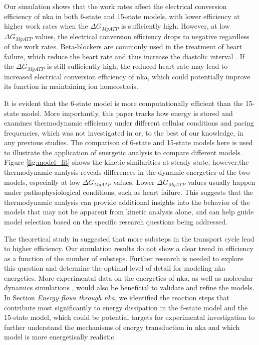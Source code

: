 \documentclass{biophys-new}
\newcommand{\rev}[1]{{\color{black} #1}}
\begin{document}
Our simulation shows that the work rates affect the electrical conversion efficiency of \gls{nka} in both 6-state and 15-state models, with lower efficiency at higher work rates when the $\Delta G_{MgATP}$ is sufficiently high. However, at low $\Delta G_{MgATP}$ values, the electrical conversion efficiency drops to negative regardless of the work rates. Beta-blockers are commonly used in the treatment of heart failure, which reduce the heart rate and thus increase the diastolic interval \cite{kotecha2017heart}. If the $\Delta G_{MgATP}$ is still sufficiently high, the reduced heart rate may lead to increased electrical conversion efficiency of \gls{nka}, which could potentially improve its function in maintaining ion homeostasis. 

\rev{It is evident that the 6-state model is more computationally efficient than the 15-state model. More importantly, this paper tracks how energy is stored and examines thermodynamic efficiency under different cellular conditions and pacing frequencies, which was not investigated in \cite{pan_cardiac_2020} or, to the best of our knowledge, in any previous studies.} The comparison of 6-state and 15-state models here is used to illustrate the application of energetic analysis to compare different models.  Figure \ref{fig:model_fit} shows the kinetic similarities at steady state; however,the thermodynamic analysis reveals differences in the dynamic energetics of the two models, especially at low $\Delta G_{MgATP}$ values. Lower $\Delta G_{MgATP}$ values usually happen under pathophysiological conditions, such as heart failure. This suggests that the thermodynamic analysis can provide additional insights into the behavior of the models that may not be apparent from kinetic analysis alone, and can help guide model selection based on the specific research questions being addressed. 

The theoretical study in \cite{wagoner_mechanisms_2019} suggested that more substeps in the transport cycle lead to higher efficiency.
Our simulation results do not show a clear trend in efficiency as a function of the number of substeps. 
Further research is needed to explore this question and determine the optimal level of detail for modeling \gls{nka} energetics.
More experimental data on the energetics of \gls{nka}, as well as molecular dynamics simulations \cite{hollingsworth2018molecular}, would also be beneficial to validate and refine the models. In Section \textit{Energy flows through \gls{nka}}, we identified the reaction steps that contribute most significantly to energy dissipation in the 6-state model and the 15-state model, which could be potential targets for experimental investigation to further understand the mechanisms of energy transduction in \gls{nka} and which model is more energetically realistic.
\end{document}
